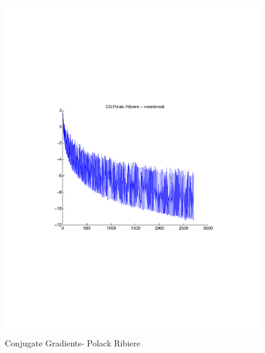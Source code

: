 \documentclass[12pt]{amsart}
\begin{document}
\begin{figure}[thpb]
\centering
\includegraphics[scale=0.60,clip=true,viewport=1in 3in 8in 8in]{images/rosenbrock-20/CGPR.pdf}
\caption{Conjugate Gradients- Polack Ribiere}
\label{fig:CGPR-rosen}
\end{figure}
\end{document}
